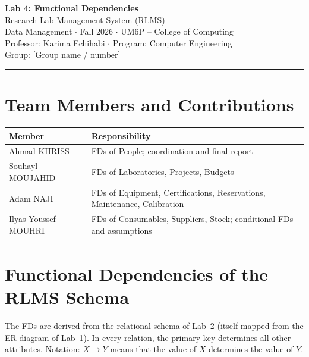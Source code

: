\documentclass[11pt,a4paper]{article}
\newcommand{\fd}{\ensuremath{\rightarrow}}
\begin{document}
\begin{center}
  {\Huge\bfseries Lab 4: Functional Dependencies}\\[0.6em]
  {\Large Research Lab Management System (RLMS)}\\[0.6em]
  Data Management $\cdot$ Fall 2026 $\cdot$ UM6P -- College of Computing\\
  Professor: Karima Echihabi $\cdot$ Program: Computer Engineering\\
  Group: [Group name / number]
\end{center}
\hrule
\vspace{1em}

\section{Team Members and Contributions}

\begin{tabular}{@{}p{4cm}p{11.5cm}@{}}
\toprule
\textbf{Member} & \textbf{Responsibility}\\
\midrule
Ahmad KHRISS& FDs of People; coordination and final report\\
Souhayl MOUJAHID& FDs of Laboratories, Projects, Budgets\\
Adam NAJI& FDs of Equipment, Certifications, Reservations, Maintenance, Calibration\\
Ilyas Youssef MOUHRI& FDs of Consumables, Suppliers, Stock; conditional FDs and assumptions\\
\bottomrule
\end{tabular}



\section{Functional Dependencies of the RLMS Schema}

The FDs are derived from the relational schema of Lab~2 (itself mapped from the ER diagram of Lab~1). In every relation, the primary key determines all other attributes. Notation: $X \fd Y$ means that the value of $X$ determines the value of $Y$.
\end{document}
